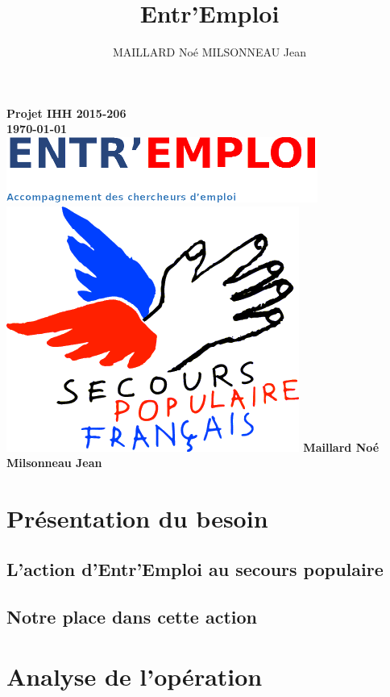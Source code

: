 \documentclass{report}
\title{Entr'Emploi}
\author{MAILLARD Noé MILSONNEAU Jean}
\begin{document}
\begin{titlepage}
    \centering
    {\bfseries\Large
        Projet IHH 2015-206\\
        \today\\
        \vskip15mm
        \includegraphics{../../public/images/Logo-entremploi-md.png}
        \vskip1cm
        \includegraphics{../../public/images/Logo-spf.png}
        \vskip10mm
        Maillard Noé Milsonneau Jean\\
    }    
    \normalsize
\end{titlepage}

\tableofcontents

 
\chapter{Présentation du besoin}
\section{L'action d'Entr'Emploi au secours populaire}
\section{Notre place dans cette action}

\chapter{Analyse de l’opération}
\end{document}
